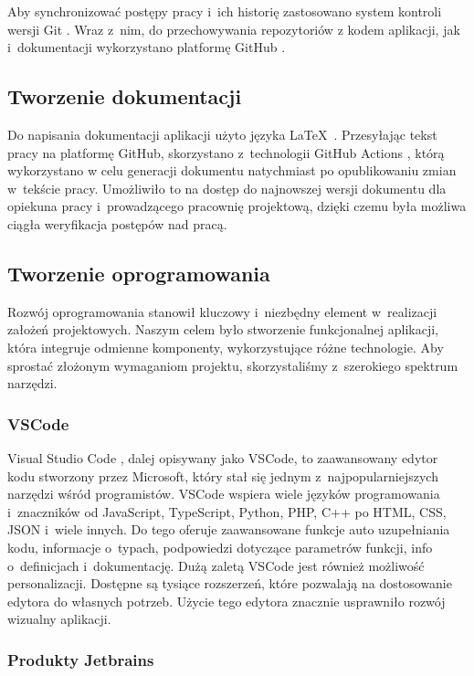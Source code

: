 Aby synchronizować postępy pracy i~ich historię zastosowano
system kontroli wersji Git \cite{Git}. Wraz z~nim, do przechowywania
repozytoriów z kodem aplikacji, jak i~dokumentacji wykorzystano
platformę GitHub \cite{Github}.

\subsection{Tworzenie dokumentacji}

Do napisania dokumentacji aplikacji użyto języka \LaTeX~\cite{Latex}.
Przesyłając tekst pracy na platformę GitHub, skorzystano z~technologii
GitHub Actions \cite{GithubActions}, którą wykorzystano w celu
generacji dokumentu natychmiast po opublikowaniu zmian w~tekście pracy.
Umożliwiło to na dostęp do najnowszej wersji dokumentu dla opiekuna
pracy i~prowadzącego pracownię projektową, dzięki czemu była możliwa
ciągła weryfikacja postępów nad pracą.


\subsection{Tworzenie oprogramowania}

Rozwój oprogramowania stanowił kluczowy i~niezbędny element w~realizacji
założeń projektowych.
Naszym celem było stworzenie funkcjonalnej aplikacji, która integruje
odmienne komponenty, wykorzystujące różne technologie.
Aby sprostać złożonym wymaganiom projektu, skorzystaliśmy z~szerokiego
spektrum narzędzi.

\subsubsection{VSCode}

Visual Studio Code \cite{VSCode}, dalej opisywany jako VSCode,
to zaawansowany edytor kodu stworzony
przez Microsoft, który stał się jednym z~najpopularniejszych narzędzi
wśród programistów.
VSCode wspiera wiele języków programowania i~znaczników od JavaScript,
TypeScript, Python, PHP, C++ po HTML, CSS, JSON i~wiele innych.
Do tego oferuje zaawansowane funkcje auto uzupełniania kodu, informacje
o~typach, podpowiedzi dotyczące parametrów funkcji, info o~definicjach
i~dokumentację.
Dużą zaletą VSCode jest również możliwość personalizacji. Dostępne są
tysiące rozszerzeń, które pozwalają na dostosowanie edytora do własnych
potrzeb. Użycie tego edytora znacznie usprawniło rozwój wizualny aplikacji.

\subsubsection{Produkty Jetbrains}

